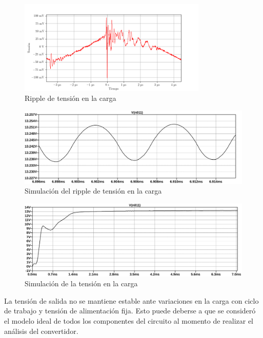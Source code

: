 \begin{figure}[H]
    \centering
    \includegraphics[width=0.8\textwidth]{images/capturas-osciloscopio/17-11-2022/58.png}
    \caption{Ripple de tensión en la carga}
    \label{fig:osc:58}
\end{figure}

\begin{figure}[H]
    \centering
    \includegraphics[width=\textwidth]{images/sim/21-ripple.pdf}
    \caption{Simulación del ripple de tensión en la carga}
    \label{fig:sim:21ripple}
\end{figure}

\begin{figure}[H]
    \centering
    \includegraphics[width=\textwidth]{images/sim/21.pdf}
    \caption{Simulación de la tensión en la carga}
    \label{fig:sim:21}
\end{figure}

La tensión de salida no se mantiene estable ante variaciones en la carga con ciclo de trabajo y tensión de alimentación fija. 
Esto puede deberse a que se consideró el modelo ideal de todos los componentes del circuito al momento de realizar el análisis del convertidor. 

